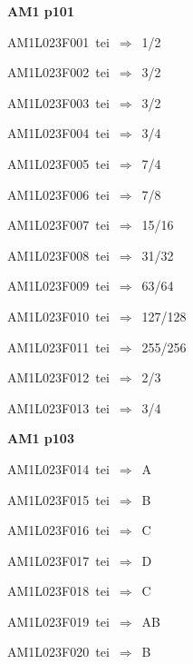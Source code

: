 \par\vfill\eject
{\bf\hfill AM1 p101\hfill\hbox{}}\par\bigskip
{\sixrm AM1L023F001\ {\sixit tei}\ }$\Rightarrow$\ 1/2\par\smallskip
{\sixrm AM1L023F002\ {\sixit tei}\ }$\Rightarrow$\ 3/2\par\smallskip
{\sixrm AM1L023F003\ {\sixit tei}\ }$\Rightarrow$\ 3/2\par\smallskip
{\sixrm AM1L023F004\ {\sixit tei}\ }$\Rightarrow$\ 3/4\par\smallskip
{\sixrm AM1L023F005\ {\sixit tei}\ }$\Rightarrow$\ 7/4\par\smallskip
{\sixrm AM1L023F006\ {\sixit tei}\ }$\Rightarrow$\ 7/8\par\smallskip
{\sixrm AM1L023F007\ {\sixit tei}\ }$\Rightarrow$\ 15/16\par\smallskip
{\sixrm AM1L023F008\ {\sixit tei}\ }$\Rightarrow$\ 31/32\par\smallskip
{\sixrm AM1L023F009\ {\sixit tei}\ }$\Rightarrow$\ 63/64\par\smallskip
{\sixrm AM1L023F010\ {\sixit tei}\ }$\Rightarrow$\ 127/128\par\smallskip
{\sixrm AM1L023F011\ {\sixit tei}\ }$\Rightarrow$\ 255/256\par\smallskip
{\sixrm AM1L023F012\ {\sixit tei}\ }$\Rightarrow$\ 2/3\par\smallskip
{\sixrm AM1L023F013\ {\sixit tei}\ }$\Rightarrow$\ 3/4\par\smallskip

\par\vfill\eject
{\bf\hfill AM1 p103\hfill\hbox{}}\par\bigskip
{\sixrm AM1L023F014\ {\sixit tei}\ }$\Rightarrow$\ A\par\smallskip
{\sixrm AM1L023F015\ {\sixit tei}\ }$\Rightarrow$\ B\par\smallskip
{\sixrm AM1L023F016\ {\sixit tei}\ }$\Rightarrow$\ C\par\smallskip
{\sixrm AM1L023F017\ {\sixit tei}\ }$\Rightarrow$\ D\par\smallskip
{\sixrm AM1L023F018\ {\sixit tei}\ }$\Rightarrow$\ C\par\smallskip
{\sixrm AM1L023F019\ {\sixit tei}\ }$\Rightarrow$\ AB\par\smallskip
{\sixrm AM1L023F020\ {\sixit tei}\ }$\Rightarrow$\ B\par\smallskip

